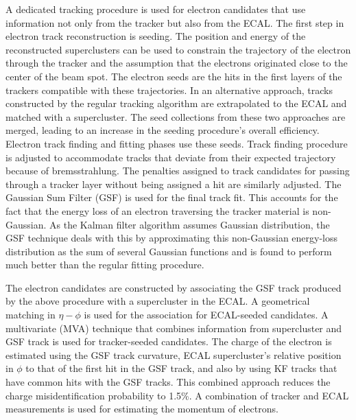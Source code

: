 A dedicated tracking procedure is used for electron candidates that use information not only from the tracker but also from the ECAL. The first step in electron track reconstruction is seeding. The position and energy of the reconstructed superclusters can be used to constrain the trajectory of the electron through the tracker and the assumption that the electrons originated close to the center of the beam spot. The electron seeds are the hits in the first layers of the trackers compatible with these trajectories. In an alternative approach, tracks constructed by the regular tracking algorithm are extrapolated to the ECAL and matched with a supercluster. The seed collections from these two approaches are merged, leading to an increase in the seeding procedure's overall efficiency. Electron track finding and fitting phases use these seeds. Track finding procedure is adjusted to accommodate tracks that deviate from their expected trajectory because of bremsstrahlung. The penalties assigned to track candidates for passing through a tracker layer without being assigned a hit are similarly adjusted. The Gaussian Sum Filter (GSF) is used for the final track fit. This accounts for the fact that the energy loss of an electron traversing the tracker material is non-Gaussian. As the Kalman filter algorithm assumes Gaussian distribution, the GSF technique deals with this by approximating this non-Gaussian energy-loss distribution as the sum of several Gaussian functions and is found to perform much better than the regular fitting procedure.

The electron candidates are constructed by associating the GSF track produced by the above procedure with a supercluster in the ECAL. A geometrical matching in $\eta-\phi$ is used for the association for ECAL-seeded candidates. A multivariate (MVA) technique that combines information from supercluster and GSF track is used for tracker-seeded candidates. The charge of the electron is estimated using the GSF track curvature, ECAL supercluster's relative position in $\phi$ to that of the first hit in the GSF track, and also by using KF tracks that have common hits with the GSF tracks. This combined approach reduces the charge misidentification probability to 1.5\%. A combination of tracker and ECAL measurements is used for estimating the momentum of electrons.

